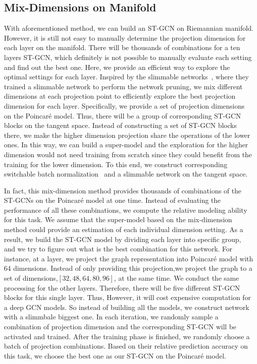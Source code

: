 \documentclass[letterpaper]{article} \usepackage{aaai19}  \usepackage{times}  \usepackage{helvet} \usepackage{courier}  \usepackage[hyphens]{url}  \usepackage{graphicx} \urlstyle{rm} \def\UrlFont{\rm}  \usepackage{graphicx}  \frenchspacing  \setlength{\pdfpagewidth}{8.5in}  \setlength{\pdfpageheight}{11in}
\begin{document}
\subsection{Mix-Dimensions on Manifold}

With aforementioned method, we can build an ST-GCN on Riemannian manifold. However, it is still not easy to manually determine the projection dimension for each layer on the manifold. There will be thousands of combinations for a ten layers ST-GCN, which definitely is not possible to manually evaluate each setting and find out the best one. Here, we provide an efficient way to explore the optimal settings for each layer. Inspired by the slimmable networks~\cite{yu2018slimmable}, where they trained a slimmable network to perform the network pruning, we mix different dimensions at each projection point to efficiently explore the best projection dimension for each layer. Specifically, we provide a set of projection dimensions on the Poincar\'e model. Thus, there will be a group of corresponding ST-GCN blocks on the tangent space. Instead of constructing a set of ST-GCN blocks there, we make the higher dimension projection share the operations of the lower ones. In this way, we can build a super-model and the exploration for the higher dimension would not need training from scratch since they could benefit from the training for the lower dimension. To this end, we construct corresponding switchable batch normalization~\cite{yu2018slimmable} and a slimmable network on the tangent space.

In fact, this mix-dimension method provides thousands of combinations of the ST-GCNs on the Poincar\'e model at one time. Instead of evaluating the performance of all these combinations, we compute the relative modeling ability for this task. We assume that the super-model based on the mix-dimension method could provide an estimation of each individual dimension setting. As a result, we build the ST-GCN model by dividing each layer into specific group, and we try to figure out what is the best combination for this network. For instance, at a layer, we project the graph representation into Poincar\'e model with 64 dimensions. Instead of only providing this projection,we project the graph to a set of dimensions,$[32, 48, 64, 80, 96]$, at the same time. We conduct the same processing for the other layers. Therefore, there will be five different ST-GCN blocks for this single layer. Thus, However, it will cost expensive computation for a deep GCN models. So instead of building all the models, we construct network with a slimmbale biggest one. In each iteration, we randomly sample a combination of projection dimension and the corresponding ST-GCN will be activated and trained. After the training phase is finished, we randomly choose a batch of projection combinations. Based on their relative prediction accuracy on this task, we choose the best one as our ST-GCN on the Poincar\'e model. 
\end{document}
